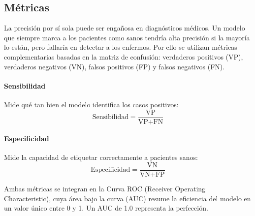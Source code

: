 \subsection{Métricas}
La precisión por sí sola puede ser engañosa en diagnósticos médicos. Un modelo que siempre marca a los pacientes como sanos tendría alta precisión si la mayoría lo están, pero fallaría en detectar a los enfermos. Por ello se utilizan métricas complementarias basadas en la matriz de confusión: verdaderos positivos (VP), verdaderos negativos (VN), falsos positivos (FP) y falsos negativos (FN).

\paragraph{Sensibilidad} Mide qué tan bien el modelo identifica los casos positivos:
\[
\text{Sensibilidad} = \frac{\text{VP}}{\text{VP} + \text{FN}}
\]

\paragraph{Especificidad} Mide la capacidad de etiquetar correctamente a pacientes sanos:
\[
\text{Especificidad} = \frac{\text{VN}}{\text{VN} + \text{FP}}
\]

Ambas métricas se integran en la Curva ROC (Receiver Operating Characteristic), cuya área bajo la curva (AUC) resume la eficiencia del modelo en un valor único entre 0 y 1. Un AUC de 1.0 representa la perfección.